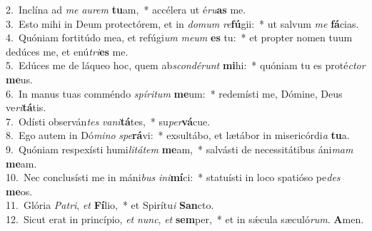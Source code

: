 {2.~}Inclína ad \textit{me} \textit{au}\textit{rem} \textbf{tu}am,~* accélera ut é\textit{ru}\textbf{as} me.\\
{3.~}Esto mihi in Deum protectórem, et in \textit{do}\textit{mum} \textit{re}\textbf{fú}gii:~* ut salvum \textit{me} \textbf{fá}cias.\\
{4.~}Quóniam fortitúdo mea, et refúgi\textit{um} \textit{me}\textit{um} \textbf{es} tu:~* et propter nomen tuum dedúces me, et enú\textit{tri}\textbf{es} me.\\
{5.~}Edúces me de láqueo hoc, quem ab\textit{scon}\textit{dé}\textit{runt} \textbf{mi}hi:~* quóniam tu es proté\textit{ctor} \textbf{me}us.\\
{6.~}In manus tuas comméndo \textit{spí}\textit{ri}\textit{tum} \textbf{me}um:~* redemísti me, Dómine, Deus ve\textit{ri}\textbf{tá}tis.\\
{7.~}Odísti observán\textit{tes} \textit{va}\textit{ni}\textbf{tá}tes,~* su\textit{per}\textbf{vá}cue.\\
{8.~}Ego autem in Dó\textit{mi}\textit{no} \textit{spe}\textbf{rá}vi:~* exsultábo, et lætábor in misericórdi\textit{a} \textbf{tu}a.\\
{9.~}Quóniam respexísti humi\textit{li}\textit{tá}\textit{tem} \textbf{me}am,~* salvásti de necessitátibus áni\textit{mam} \textbf{me}am.\\
{10.~}Nec conclusísti me in máni\textit{bus} \textit{i}\textit{ni}\textbf{mí}ci:~* statuísti in loco spatióso pe\textit{des} \textbf{me}os.\\
{11.~}Glória \textit{Pa}\textit{tri}, \textit{et} \textbf{Fí}lio,~* et Spirítu\textit{i} \textbf{San}cto.\\
{12.~}Sicut erat in princípio, \textit{et} \textit{nunc}, \textit{et} \textbf{sem}per,~* et in sǽcula sæculó\textit{rum}. \textbf{A}men.\\
